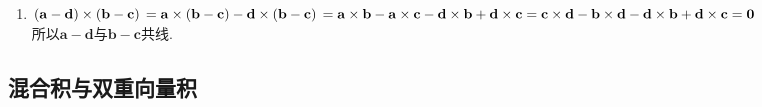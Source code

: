 \documentclass[UTF8]{ctexart}
\begin{document}
\begin{enumerate}
\item $\left(\mathbf{a}-\mathbf{d}\right)\times\left(\mathbf{b}-\mathbf{c}\right)\\
=\mathbf{a}\times\left(\mathbf{b}-\mathbf{c}\right)-\mathbf{d}\times\left(\mathbf{b}-\mathbf{c}\right)\\
=\mathbf{a}\times\mathbf{b}-\mathbf{a}\times\mathbf{c}-\mathbf{d}\times\mathbf{b}+\mathbf{d}\times\mathbf{c}\\
=\mathbf{c}\times\mathbf{d}-\mathbf{b}\times\mathbf{d}-\mathbf{d}\times\mathbf{b}+\mathbf{d}\times\mathbf{c}\\
=\mathbf{0}$\\
所以$\mathbf{a}-\mathbf{d}$与$\mathbf{b}-\mathbf{c}$共线. 
\end{enumerate}

\subsection{混合积与双重向量积}
\end{document}
